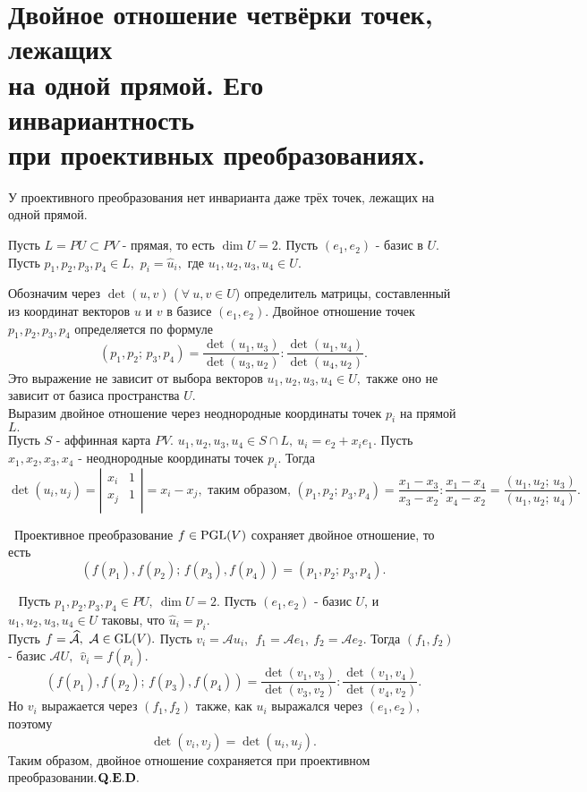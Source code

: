 \documentclass[draft]{article}%
\newcommand{\ab}{\par\noindent}%
\newcommand{\te}{\par\noindent{\bf Теорема.}\ }%
\newcommand{\dok}{\par\noindent{\textsl{Доказательство}.}\ }%
\newcommand{\qed}{\quad${{\bf Q.E.D.}}$}
\newcommand{\om}[1]{\mathcal{#1}}
\newcommand{\we}[1]{\widehat{#1}}
\begin{document}
\section{Двойное отношение четвёрки точек, лежащих\\ на одной прямой. Его инвариантность\\ при проективных преобразованиях.}
\label{q54}
У проективного преобразования нет инварианта даже трёх точек, лежащих на одной прямой.
\ab Пусть $L=PU\subset PV$ - прямая, то есть\; $\dim U=2.$
Пусть $(e_1,e_2)$ - базис в $U$. Пусть $p_1,p_2,p_3,p_4\in L,$ $p_i=\we{u}_i,$ где $u_1,u_2,u_3,u_4\in U.$
\ab Обозначим через $\det(u,v)$ ($\ \forall \ u,v\in U$) определитель матрицы, составленный из координат векторов
$u$ и $v$ в базисе $(e_1,e_2).$ Двойное отношение точек $p_1,p_2,p_3,p_4$ определяется по формуле
$$
(p_1,p_2;\,p_3,p_4)=\frac{\displaystyle \det(u_1,u_3)}{\displaystyle \det(u_3,u_2)}:\frac{\displaystyle\det(u_1,u_4)}{\displaystyle\det(u_4,u_2)}.
$$
Это выражение не зависит от выбора векторов $u_1,u_2,u_3,u_4\in U,$ также оно не зависит от базиса пространства $U$.
\\Выразим двойное отношение через неоднородные координаты точек $p_i$ на прямой $L.$
\\Пусть $S$ - аффинная карта $PV$. $u_1,u_2,u_3,u_4\in S\cap L,\ u_i=e_2+x_ie_1.$
Пусть $x_1,x_2,x_3,x_4$ - неоднородные координаты точек $p_i$. Тогда
$$
\det(u_i,u_j)=\left|%
\begin{array}{cc}
  x_i & 1 \\
  x_j & 1 \\
\end{array}%
\right|=x_i-x_j,\mbox{ таким образом, }(p_1,p_2;\,p_3,p_4)=\frac{\displaystyle x_1-x_3}{\displaystyle x_3-x_2}:
\frac{\displaystyle x_1-x_4}{\displaystyle x_4-x_2}=\frac{\displaystyle (u_1,u_2;\,u_3)}{\displaystyle (u_1,u_2;\,u_4)}.
$$
\te Проективное преобразование $f\in{\rm PGL}(V)$ сохраняет двойное отношение, то есть $$
\left(f(p_1),f(p_2);\,f(p_3),f(p_4)\right)=(p_1,p_2;\,p_3,p_4).
$$
\dok
Пусть $p_1,p_2,p_3,p_4\in PU,\ \dim U=2.$  Пусть $(e_1,e_2)$ - базис $U$, и $u_1,u_2,u_3,u_4\in U$ таковы, что $\we{u}_i=p_i.$
\\Пусть $f=\om{\we{A}},\ \om{A}\in {\rm GL}(V).$ Пусть $v_i=\om{A}u_i,\ \ f_1=\om{A}e_1,\ f_2=\om{A}e_2.$ Тогда $(f_1,f_2)$ -
базис $\om{A}U,\ \ \we{v}_i=f(p_i).$
$$
\left(f(p_1),f(p_2);\,f(p_3),f(p_4)\right)=\frac{\displaystyle \det(v_1,v_3)}{\displaystyle \det(v_3,v_2)}:\frac{\displaystyle\det(v_1,v_4)}{\displaystyle\det(v_4,v_2)}.
$$
Но $v_i$ выражается через $(f_1,f_2)$ также, как $u_i$ выражался через $(e_1,e_2),$ поэтому
$$\det(v_i,v_j)=\det(u_i,u_j).$$
Таким образом, двойное отношение сохраняется при проективном преобразовании.\qed
\end{document}
